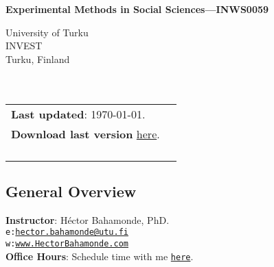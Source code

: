 \documentclass[letterpaper]{article}
\def\name{Experimental Methods in Social Sciences---INWS0059}
\begin{document}

\centerline{\huge \bf \name}



\vspace{0.25in}

\begin{minipage}{0.45\linewidth}
 University of Turku \\
  INVEST \\
  Turku, Finland\\
  \\
  \\

\end{minipage}
\hspace{4cm}\begin{minipage}{0.45\linewidth}
  \begin{tabular}{ll}
{\bf Last updated}: \today. \\
 {\bf Download last version} \href{https://github.com/hbahamonde/Exp_Soc_Science/raw/main/Bahamonde_Exp_Soc_Sci.pdf}{here}.%
    \\
    \\
    \\
    \\
    \\
  \end{tabular}
\end{minipage}

\subsection*{General Overview}


\vspace{1mm}
{\bf Instructor}: H\'ector Bahamonde, PhD.\\
\texttt{e:}\href{mailto:hector.bahamonde@utu.fi}{\texttt{hector.bahamonde@utu.fi}}\\
\texttt{w:}\href{http://www.hectorbahamonde.com}{\texttt{www.HectorBahamonde.com}}\\
{\bf Office Hours}: Schedule time with me \href{https://calendly.com/bahamonde}{\texttt{here}}.\\
\end{document}
